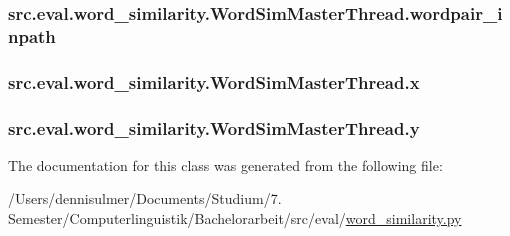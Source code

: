 \subsubsection[{\texorpdfstring{wordpair\+\_\+inpath}{wordpair\_inpath}}]{\setlength{\rightskip}{0pt plus 5cm}src.\+eval.\+word\+\_\+similarity.\+Word\+Sim\+Master\+Thread.\+wordpair\+\_\+inpath}\hypertarget{classsrc_1_1eval_1_1word__similarity_1_1_word_sim_master_thread_a1322d5a0ef82c1b69d2cbf4b2f2bb9b0}{}\label{classsrc_1_1eval_1_1word__similarity_1_1_word_sim_master_thread_a1322d5a0ef82c1b69d2cbf4b2f2bb9b0}
\subsubsection[{\texorpdfstring{x}{x}}]{\setlength{\rightskip}{0pt plus 5cm}src.\+eval.\+word\+\_\+similarity.\+Word\+Sim\+Master\+Thread.\+x}\hypertarget{classsrc_1_1eval_1_1word__similarity_1_1_word_sim_master_thread_abfec0653260234f16e22e15c689a168f}{}\label{classsrc_1_1eval_1_1word__similarity_1_1_word_sim_master_thread_abfec0653260234f16e22e15c689a168f}
\subsubsection[{\texorpdfstring{y}{y}}]{\setlength{\rightskip}{0pt plus 5cm}src.\+eval.\+word\+\_\+similarity.\+Word\+Sim\+Master\+Thread.\+y}\hypertarget{classsrc_1_1eval_1_1word__similarity_1_1_word_sim_master_thread_ae1722e9d60c02419eb0c493592761d10}{}\label{classsrc_1_1eval_1_1word__similarity_1_1_word_sim_master_thread_ae1722e9d60c02419eb0c493592761d10}


The documentation for this class was generated from the following file\+:\begin{DoxyCompactItemize}
\item 
/\+Users/dennisulmer/\+Documents/\+Studium/7. Semester/\+Computerlinguistik/\+Bachelorarbeit/src/eval/\hyperlink{word__similarity_8py}{word\+\_\+similarity.\+py}\end{DoxyCompactItemize}
